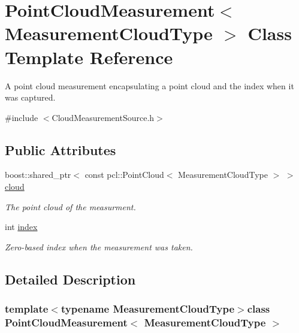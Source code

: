 \hypertarget{class_point_cloud_measurement}{}\section{Point\+Cloud\+Measurement$<$ Measurement\+Cloud\+Type $>$ Class Template Reference}
\label{class_point_cloud_measurement}


A point cloud measurement encapsulating a point cloud and the index when it was captured.  




{\ttfamily \#include $<$Cloud\+Measurement\+Source.\+h$>$}

\subsection*{Public Attributes}
\begin{DoxyCompactItemize}
\item 
\hypertarget{class_point_cloud_measurement_a5bd9e2e9d846f0830719cf8f8e6a68b3}{}boost\+::shared\+\_\+ptr$<$ const pcl\+::\+Point\+Cloud$<$ Measurement\+Cloud\+Type $>$ $>$ \hyperlink{class_point_cloud_measurement_a5bd9e2e9d846f0830719cf8f8e6a68b3}{cloud}\label{class_point_cloud_measurement_a5bd9e2e9d846f0830719cf8f8e6a68b3}

\begin{DoxyCompactList}\small\item\em The point cloud of the measurment. \end{DoxyCompactList}\item 
\hypertarget{class_point_cloud_measurement_a2880c485e589447d57e71bec0ff61eed}{}int \hyperlink{class_point_cloud_measurement_a2880c485e589447d57e71bec0ff61eed}{index}\label{class_point_cloud_measurement_a2880c485e589447d57e71bec0ff61eed}

\begin{DoxyCompactList}\small\item\em Zero-\/based index when the measurement was taken. \end{DoxyCompactList}\end{DoxyCompactItemize}


\subsection{Detailed Description}
\subsubsection*{template$<$typename Measurement\+Cloud\+Type$>$class Point\+Cloud\+Measurement$<$ Measurement\+Cloud\+Type $>$}

